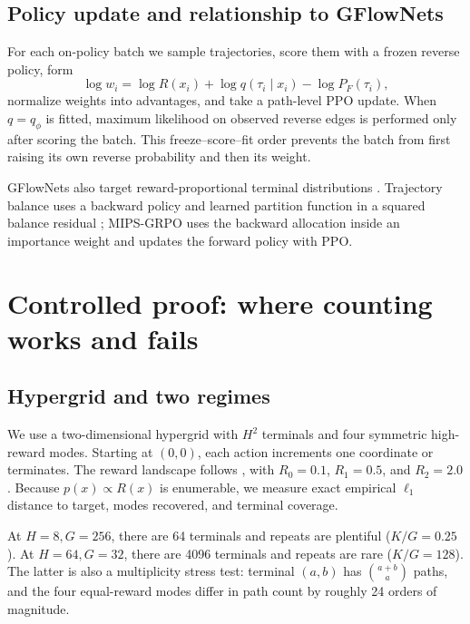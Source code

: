 \documentclass[11pt]{article}
\begin{document}
\subsection{Policy update and relationship to GFlowNets}

For each on-policy batch we sample trajectories, score them with a frozen
reverse policy, form
\begin{equation}
 \log w_i=\log R(x_i)+\log q(\tau_i\mid x_i)-\log P_F(\tau_i),
\end{equation}
normalize weights into advantages, and take a path-level PPO update. When
\(q=q_\phi\) is fitted, maximum likelihood on observed reverse edges is
performed only after scoring the batch. This freeze--score--fit order prevents
the batch from first raising its own reverse probability and then its weight.

GFlowNets also target reward-proportional terminal distributions
\citep{bengio2021gflownet,bengio2023foundations}. Trajectory balance uses a
backward policy and learned partition function in a squared balance residual
\citep{malkin2022tb}; MIPS-GRPO uses the backward allocation inside an
importance weight and updates the forward policy with PPO.



\section{Controlled proof: where counting works and fails}

\subsection{Hypergrid and two regimes}

We use a two-dimensional hypergrid with \(H^2\) terminals and four symmetric
high-reward modes. Starting at \((0,0)\), each action increments one coordinate
or terminates. The reward landscape follows \citet{sinha2026ips}, with
\(R_0=0.1\), \(R_1=0.5\), and \(R_2=2.0\). Because
\(p(x)\propto R(x)\) is enumerable, we measure exact empirical \(\ell_1\)
distance to target, modes recovered, and terminal coverage.

At \(H=8,G=256\), there are 64 terminals and repeats are plentiful
(\(K/G=0.25\)). At \(H=64,G=32\), there are 4096 terminals and repeats are
rare (\(K/G=128\)). The latter is also a multiplicity stress test: terminal
\((a,b)\) has \(\binom{a+b}{a}\) paths, and the four equal-reward modes differ
in path count by roughly 24 orders of magnitude.
\end{document}

